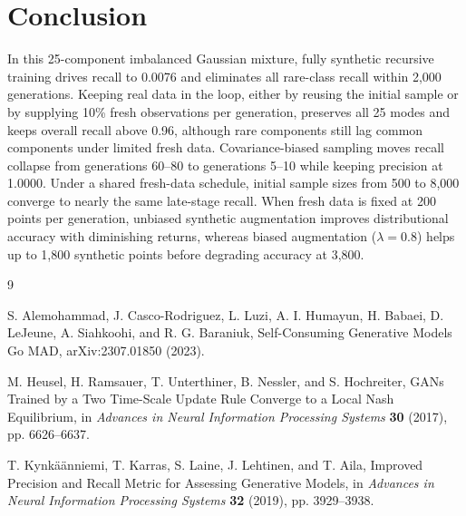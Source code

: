 \documentclass[11pt,a4paper]{article}
\begin{document}
\FloatBarrier
\section{Conclusion}

In this 25-component imbalanced Gaussian mixture, fully synthetic recursive training drives recall to 0.0076 and eliminates all rare-class recall within 2,000 generations. Keeping real data in the loop, either by reusing the initial sample or by supplying 10\% fresh observations per generation, preserves all 25 modes and keeps overall recall above 0.96, although rare components still lag common components under limited fresh data. Covariance-biased sampling moves recall collapse from generations 60--80 to generations 5--10 while keeping precision at 1.0000. Under a shared fresh-data schedule, initial sample sizes from 500 to 8,000 converge to nearly the same late-stage recall. When fresh data is fixed at 200 points per generation, unbiased synthetic augmentation improves distributional accuracy with diminishing returns, whereas biased augmentation ($\lambda=0.8$) helps up to 1,800 synthetic points before degrading accuracy at 3,800.


\FloatBarrier\begin{thebibliography}{9}

S. Alemohammad, J. Casco-Rodriguez, L. Luzi, A. I. Humayun, H. Babaei, D. LeJeune, A. Siahkoohi, and R. G. Baraniuk, Self-Consuming Generative Models Go MAD, arXiv:2307.01850 (2023).

M. Heusel, H. Ramsauer, T. Unterthiner, B. Nessler, and S. Hochreiter, GANs Trained by a Two Time-Scale Update Rule Converge to a Local Nash Equilibrium, in \emph{Advances in Neural Information Processing Systems} \textbf{30} (2017), pp. 6626--6637.

T. Kynkäänniemi, T. Karras, S. Laine, J. Lehtinen, and T. Aila, Improved Precision and Recall Metric for Assessing Generative Models, in \emph{Advances in Neural Information Processing Systems} \textbf{32} (2019), pp. 3929--3938.

\end{thebibliography}
\end{document}
